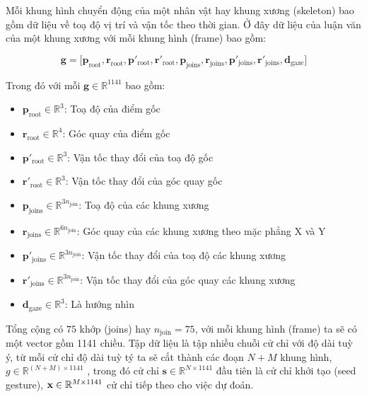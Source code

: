 Mỗi khung hình chuyển động của một nhân vật hay khung xương (skeleton) bao gồm dữ liệu về toạ độ vị trí và vận tốc theo thời gian.
Ở đây dữ liệu của luận văn của một khung xương với mỗi khung hình (frame) bao gồm:

\begin{equation} \label{eq:gesturevector}
\mathbf{g} = \Big[ \mathbf{p}_{\text{root}},  \mathbf{r}_{\text{root}},
\mathbf{ p }'_{\text{root}},  \mathbf{r}'_{\text{root}},
\mathbf{p}_{\text{joins}},  \mathbf{r}_{\text{joins}},
\mathbf{p}'_{\text{joins}},  \mathbf{r}'_{\text{joins}},
\mathbf{d}_{\text{gaze}}
\Big]
\end{equation}



Trong  đó với mỗi $\mathbf{g} \in \mathbb{R}^{1141}$ bao gồm:
{
\begin{itemize}
	\item $\mathbf{p}_{\text{root}} \in \mathbb{R}^3$: Toạ độ của điểm gốc
	\item $\mathbf{r}_{\text{root}} \in \mathbb{R}^4$: Góc quay của điểm gốc
	\item $\mathbf{p}'_{\text{root}} \in \mathbb{R}^3$: Vận tốc thay đổi của toạ độ gốc
	\item $\mathbf{r}'_{\text{root}} \in \mathbb{R}^3$: Vận tốc thay đổi của góc quay gốc
	
	\item $\mathbf{p}_{\text{joins}} \in \mathbb{R}^{3 n_{\text{join} }}$: Toạ độ của các khung xương
	\item $\mathbf{r}_{\text{joins}} \in \mathbb{R}^{6 n_{\text{join} }}$: Góc quay của các khung xương theo mặc phẳng X và Y
	\item $\mathbf{p}'_{\text{joins}} \in \mathbb{R}^{3n_{\text{join} }}$: Vận tốc thay đổi của toạ độ các khung xương
	\item $\mathbf{r}'_{\text{joins}} \in \mathbb{R}^{3n_{\text{join} }}$: Vận tốc thay đổi của góc quay các khung xương
	\item $\mathbf{d}_{\text{gaze}} \in \mathbb{R}^3$: Là hướng nhìn
\end{itemize}}




Tổng cộng có $75$ khớp (joins) hay $n_{\text{join}} = 75$, với mỗi khung hình (frame) ta sẽ có một vector gồm 1141 chiều.
Tập dữ liệu là tập nhiều chuỗi cử chỉ với độ dài tuỳ ý, từ mỗi cử chỉ độ dài tuỳ tý ta sẽ cắt thành các đoạn $N + M$ khung hình, $g \in \mathbb{R}^{(N + M) \times 1141}$ , trong đó cử chỉ $\mathbf{s} \in \mathbb{R}^{N \times 1141}$ đầu tiên là cử chỉ khởi tạo (seed gesture), $\mathbf{x} \in \mathbb{R}^{M \times 1141}$ cử chỉ tiếp theo cho việc dự đoán.


